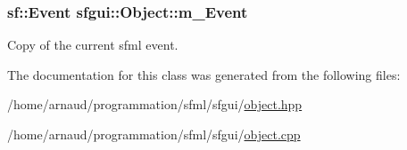 \hypertarget{classsfgui_1_1Object_bd45c91f926c930806870ce8acbb955e}{
\subsubsection[m\_\-Event]{\setlength{\rightskip}{0pt plus 5cm}sf::Event {\bf sfgui::Object::m\_\-Event}}}
\label{classsfgui_1_1Object_bd45c91f926c930806870ce8acbb955e}


Copy of the current sfml event. 



The documentation for this class was generated from the following files:\begin{CompactItemize}
\item 
/home/arnaud/programmation/sfml/sfgui/\hyperlink{object_8hpp}{object.hpp}\item 
/home/arnaud/programmation/sfml/sfgui/\hyperlink{object_8cpp}{object.cpp}\end{CompactItemize}
